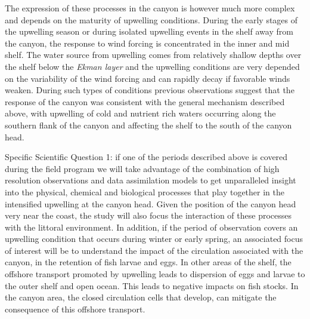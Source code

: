 The expression of these processes in the \naz canyon is however much
more complex and depends on the maturity of upwelling
conditions. During the early stages of the upwelling season or during
isolated upwelling events in the shelf away from the canyon, the
response to wind forcing is concentrated in the inner and mid
shelf. The water source from upwelling comes from relatively shallow
depths over the shelf below the \emph{Ekman layer} and the upwelling
conditions are very depended on the variability of the wind forcing
and can rapidly decay if favorable winds weaken.  During such types of
conditions previous observations suggest that the response of the \naz
canyon was consistent with the general mechanism described above, with
upwelling of cold and nutrient rich waters occurring along the
southern flank of the canyon and affecting the shelf to the south of
the canyon head.
 
\textsf{Specific Scientific Question 1:} if one of the periods
described above is covered during the \proj field program we will take
advantage of the combination of high resolution observations and data
assimilation models to get unparalleled insight into the physical,
chemical and biological processes that play together in the
intensified upwelling at the canyon head. Given the position of the
canyon head very near the coast, the study will also focus the
interaction of these processes with the littoral environment. In
addition, if the period of observation covers an upwelling condition
that occurs during winter or early spring, an associated focus of
interest will be to understand the impact of the circulation
associated with the canyon, in the retention of fish larvae and
eggs. In other areas of the shelf, the offshore transport promoted by
upwelling leads to dispersion of eggs and larvae to the outer shelf
and open ocean. This leads to negative impacts on fish stocks. In the
canyon area, the closed circulation cells that develop, can mitigate
the consequence of this offshore transport.

